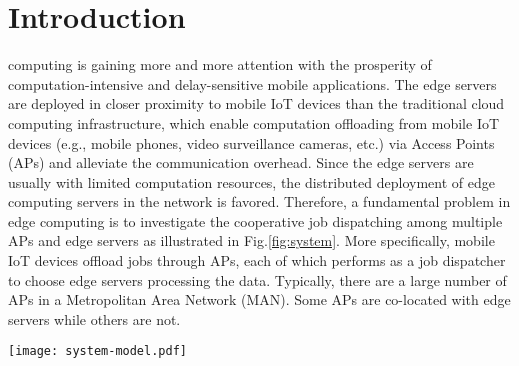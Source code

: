 \section{Introduction}
\label{sec:introduction}
 computing is gaining more and more attention with the prosperity of computation-intensive and delay-sensitive mobile applications. %
The edge servers are deployed in closer proximity to mobile IoT devices than the traditional cloud computing infrastructure, which enable computation offloading from mobile IoT devices (e.g., mobile phones, video surveillance cameras, etc.) via Access Points (APs) and alleviate the communication overhead. 
Since the edge servers are usually with limited computation resources, the distributed deployment of edge computing servers in the network is favored.
Therefore, a fundamental problem in edge computing is to investigate the cooperative job dispatching among multiple APs and edge servers as illustrated in Fig.\ref{fig:system}.
More specifically, mobile IoT devices offload jobs through APs, each of which performs as a job dispatcher to choose edge servers processing the data. Typically, there are a large number of APs in a Metropolitan Area Network (MAN). Some APs are co-located with edge servers while others are not. %

\begin{figure*}[htp!]
    \centering
    \texttt{[image: system-model.pdf]}
    \caption{The Illustration of System Model.}
    \label{fig:system}
\end{figure*}


